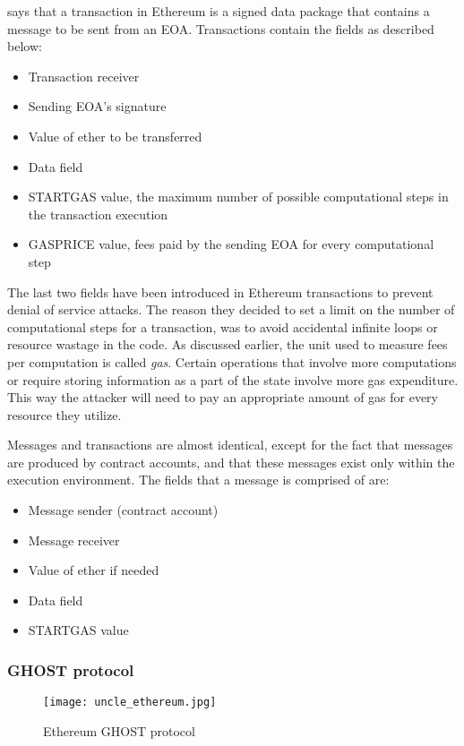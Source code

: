 \documentclass[english]{tktltiki}
\begin{document}
\cite{eth-whitepaper} says that a transaction in Ethereum is a signed data package that contains a message to be sent from an EOA. Transactions contain the fields as described below:
\begin{itemize}
\item Transaction receiver 
\item Sending EOA's signature
\item Value of ether to be transferred 
\item Data field
\item STARTGAS value, the maximum number of possible computational steps in the transaction execution
\item GASPRICE value, fees paid by the sending EOA for every computational step
\end{itemize}

The last two fields have been introduced in Ethereum transactions to prevent denial of service attacks. The reason they decided to set a limit on the number of computational steps for a transaction, was to avoid accidental infinite loops or resource wastage in the code. As discussed earlier, the unit used to measure fees per computation is called \textit{gas}. Certain operations that involve more computations or require storing information as a part of the state involve more gas expenditure. This way the attacker will need to pay an appropriate amount of gas for every resource they utilize. 

Messages and transactions are almost identical, except for the fact that messages are produced by contract accounts, and that these messages exist only within the execution environment. The fields that a message is comprised of are:

\begin{itemize}
\item Message sender (contract account)
\item Message receiver
\item Value of ether if needed
\item Data field
\item STARTGAS value
\end{itemize}

\subsubsection{GHOST protocol}

\begin{figure}[H]
\begin{center}
\texttt{[image: uncle\_ethereum.jpg]}
\caption{Ethereum GHOST protocol}
\label{ghost}
\end{center}
\end{figure}
\end{document}
